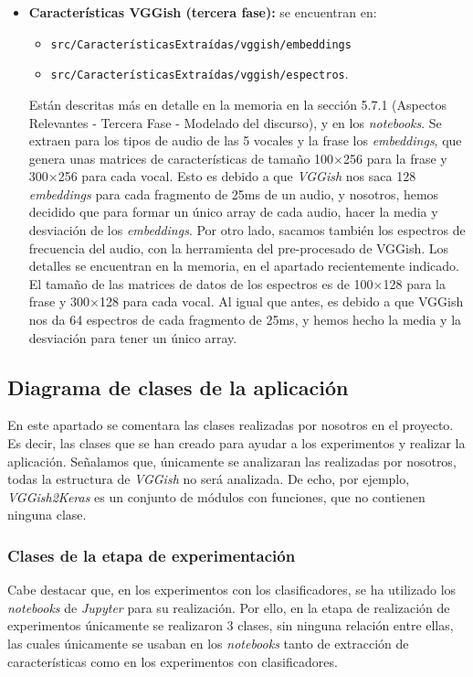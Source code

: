 \begin{itemize}
\item \textbf{Características VGGish (tercera fase):} se encuentran en:
\begin{itemize}
\item \texttt{src/CaracterísticasExtraídas/vggish/embeddings}
\item \texttt{src/CaracterísticasExtraídas/vggish/espectros}.
\end{itemize}  
Están descritas más en detalle en la memoria en la sección 5.7.1 (Aspectos Relevantes - Tercera Fase - Modelado del discurso), y en los \textit{notebooks}. Se extraen para los tipos de audio de las 5 vocales y la frase los \textit{embeddings}, que genera unas matrices de características de tamaño 100$\times$256 para la frase y 300$\times$256 para cada vocal. Esto es debido a que \textit{VGGish} nos saca 128 \textit{embeddings} para cada fragmento de 25ms de un audio, y nosotros, hemos decidido que para formar un único array de cada audio, hacer la media y desviación de los \textit{embeddings}. Por otro lado, sacamos también los espectros de frecuencia del audio, con la herramienta del pre-procesado de VGGish. Los detalles se encuentran en la memoria, en el apartado recientemente indicado. El tamaño de las matrices de datos de los espectros es de 100$\times$128 para la frase y 300$\times$128 para cada vocal. Al igual que antes, es debido a que VGGish nos da 64 espectros de cada fragmento de 25ms, y hemos hecho la media y la desviación para tener un único array.
	
\end{itemize} 

\subsection{Diagrama de clases de la aplicación}
En este apartado se comentara las clases realizadas por nosotros en el proyecto. Es decir, las clases que se han creado para ayudar a los experimentos y realizar la aplicación. Señalamos que, únicamente se analizaran las realizadas por nosotros, todas la estructura de \textit{VGGish} no será analizada. De echo, por ejemplo, \textit{VGGish2Keras} es un conjunto de módulos con funciones, que no contienen ninguna clase.

\subsubsection{Clases de la etapa de experimentación}
 Cabe destacar que, en los experimentos con los clasificadores, se ha utilizado los \textit{notebooks} de \textit{Jupyter} para su realización. Por ello, en la etapa de realización de experimentos únicamente se realizaron 3 clases, sin ninguna relación entre ellas, las cuales únicamente se usaban en los \textit{notebooks} tanto de extracción de características como en los experimentos con clasificadores. 

